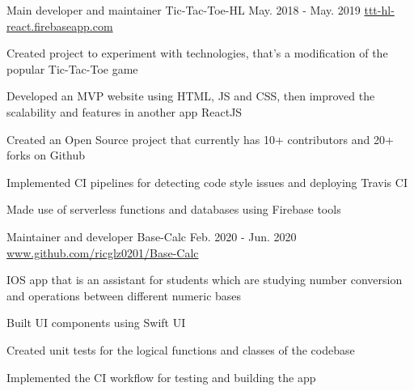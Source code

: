 \begin{cventries}
  \cventry
    {Main developer and maintainer} %
    {Tic-Tac-Toe-HL} %
    {May. 2018 - May. 2019} %
    {\url{ttt-hl-react.firebaseapp.com}} %
    {
      \begin{cvitems} %
        \item {Created project to experiment with technologies, that's a modification of the popular Tic-Tac-Toe game}
        \item {Developed an MVP website using HTML, JS and CSS, then improved the scalability and features in another app ReactJS}
        \item {Created an Open Source project that currently has 10+ contributors and 20+ forks on Github}
        \item {Implemented CI pipelines for detecting code style issues and deploying Travis CI}
        \item {Made use of serverless functions and databases using Firebase tools}
      \end{cvitems}
    }
  \cventry
    {Maintainer and developer} %
    {Base-Calc} %
    {Feb. 2020 - Jun. 2020} %
    {\url{www.github.com/ricglz0201/Base-Calc}} %
    {
      \begin{cvitems} %
        \item {IOS app that is an assistant for students which are studying number conversion and operations between different numeric bases}
        \item {Built UI components using Swift UI}
        \item {Created unit tests for the logical functions and classes of the codebase}
        \item {Implemented the CI workflow for testing and building the app}
      \end{cvitems}
    }
\end{cventries}
